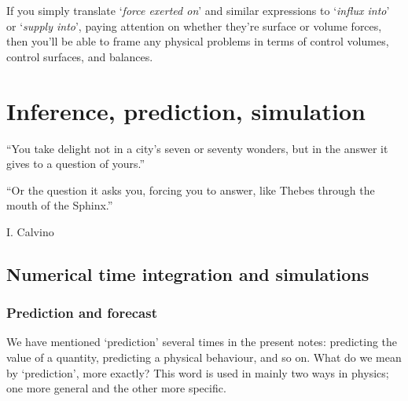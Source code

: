 \documentclass[a4paper,12pt,%
onecolumn,oneside,%
british%
]{memoir}
\renewcommand*{\|}[1][]{\nonscript\:#1\vert\nonscript\:\mathopen{}}
\begin{document}
\medskip

If you simply translate \enquote*{\emph{force exerted on\textellipsis}} and similar expressions to \enquote*{\emph{influx into\textellipsis}} or \enquote*{\emph{supply into\textellipsis}}, paying attention on whether they're surface or volume forces, then you'll be able to frame any physical problems in terms of control volumes, control surfaces, and balances.


\printpagenotes*
\clearpage
\chapter{Inference, prediction, simulation}
\label{cha:inference}

\epigraph{ \enquote{\textellipsis You take delight not in a city's seven or seventy wonders, but in the answer it gives to a question of yours.}

\medskip

 \enquote{Or the question it asks you, forcing you to answer, like Thebes through the mouth of the Sphinx.}}{I. Calvino \cites*{calvino1972_t1979}}



\section{Numerical time integration and simulations}
\label{sec:numeric_simulation}


\subsection{Prediction and forecast}
\label{sec:forecast}

We have mentioned \enquote*{prediction} several times in the present notes: predicting the value of a quantity, predicting a physical behaviour, and so on. What do we mean by \enquote*{prediction}, more exactly? This word is used in mainly two ways in physics; one more general and the other more specific.
\end{document}
